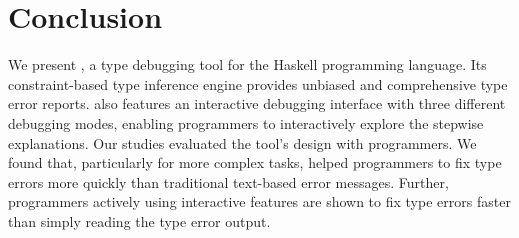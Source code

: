 \section{Conclusion}

We present \chameleon{}, a type debugging tool for the Haskell programming language. Its constraint-based type inference engine provides unbiased and comprehensive type error reports. \chameleon{} also features an interactive debugging interface with three different debugging modes, enabling programmers to interactively explore the stepwise explanations. Our studies evaluated the tool's design with programmers. We found that, particularly for more complex tasks, \chameleon{} helped programmers to fix type errors more quickly than traditional text-based error messages. Further, programmers actively using \chameleon{} interactive features are shown to fix type errors faster than simply reading the type error output.